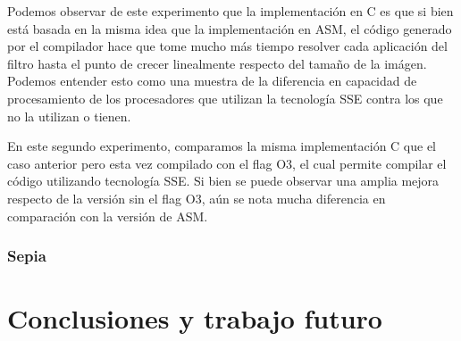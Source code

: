 \documentclass[a4paper]{article}
\newenvironment{codesnippet}{%
	\begin{Sbox}\begin{minipage}{\textwidth}\sffamily\small}%
	{\end{minipage}\end{Sbox}%
		\begin{center}%
		\vspace{-0.4cm}\colorbox{litegrey}{\TheSbox}\end{center}\vspace{0.3cm}}
\begin{document}
Podemos observar de este experimento que la implementación en C es que si bien está basada en la misma idea que la implementación en ASM,
el código generado por el compilador hace que tome mucho más tiempo resolver cada aplicación del filtro hasta el punto de crecer linealmente
respecto del tamaño de la imágen. Podemos entender esto como una muestra de la diferencia en capacidad de procesamiento de los procesadores que utilizan
la tecnología SSE contra los que no la utilizan o tienen.

\begin{figure}[!ht]
    \centering
    \begin{floatrow}
    \end{floatrow}
\end{figure}

En este segundo experimento, comparamos la misma implementación C que el caso anterior pero esta vez compilado con el flag O3, 
el cual permite compilar el código utilizando tecnología SSE. Si bien se puede observar una amplia mejora respecto de la versión
sin el flag O3, aún se nota mucha diferencia en comparación con la versión de ASM.
\newline


\subsubsection{Sepia}


\section{Conclusiones y trabajo futuro}










\end{document}
